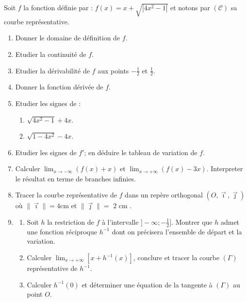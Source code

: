 \begin{exo}
Soit $f$ la fonction d\'efinie par : 
$\displaystyle{
f(x) = x + \sqrt{|4x^2 - 1|}
}$
et notons par $(\mathcal{C})$ sa courbe repr\'esentative.
\begin{enumerate}
\item Donner le domaine de d\'efinition de $f$.
\item Etudier la continuit\'e de $f$.
\item Etudier la d\'erivabilit\'e de $f$ aux points $-\frac{1}{2}$ et $\frac{1}{2}$.
\item Donner la fonction d\'eriv\'ee de $f$.
\item Etudier les signes de : 
     \begin{enumerate}
     \item $\sqrt{4x^2 - 1} + 4x$.
     \item $\sqrt{1 - 4x^2} - 4x$.
     \end{enumerate}
\item Etudier les signes de $f'$; en d\'eduire le tableau de variation de $f$.
\item Calculer $\lim_{x \rightarrow - \infty} \left( f(x) + x \right)$ et $\lim_{x \rightarrow + \infty} \left( f(x) - 3 x \right) $.
      Interpreter le r\'esultat en terme de branches infinies.
\item Tracer la courbe repr\'esentative de $f$ dans un rep\`ere orthogonal $(O, \vec{\imath},\vec{\jmath})$ o\`u $\|\vec{\imath}\| = \text{4cm}$ et $\| \vec{\jmath} \| = \text{ 2 cm } $.
\item 
      \begin{enumerate}
      \item Soit $h$ la restriction de $f$ \`a l'intervalle $]-\infty ; -\frac{1}{2} ]$.
            Montrer que $h$ admet une fonction r\'eciproque $h^{-1}$ dont on pr\'ecisera l'ensemble de d\'epart et la variation.
      \item Calculer $\lim_{x \rightarrow + \infty} \left[ x + h^{-1} (x) \right]$, conclure et tracer la courbe $(\Gamma)$ repr\'esentative de $h^{-1}$.
      \item Calculer $h^{-1} (0)$ et d\'eterminer une \'equation de la tangente \`a $(\Gamma)$ au point $O$.
      \end{enumerate}
\end{enumerate}
\end{exo}

